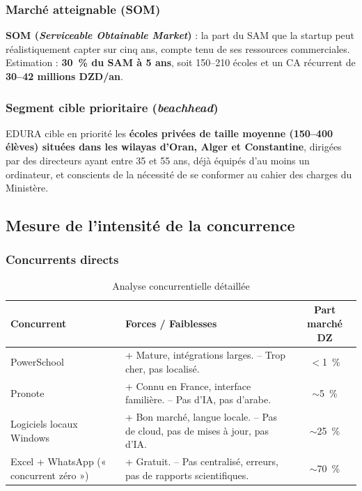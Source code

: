 \documentclass[12pt,a4paper,oneside]{report}
\begin{document}
\subsubsection{Marché atteignable (SOM)}

\textbf{SOM (\textit{Serviceable Obtainable Market})} : la part du SAM que la startup peut réalistiquement capter sur cinq ans, compte tenu de ses ressources commerciales. Estimation : \textbf{30~\% du SAM à 5 ans}, soit 150--210 écoles et un CA récurrent de \textbf{30--42 millions DZD/an}.

\subsubsection{Segment cible prioritaire (\textit{beachhead})}

EDURA cible en priorité les \textbf{écoles privées de taille moyenne (150--400 élèves) situées dans les wilayas d'Oran, Alger et Constantine}, dirigées par des directeurs ayant entre 35 et 55 ans, déjà équipés d'au moins un ordinateur, et conscients de la nécessité de se conformer au cahier des charges du Ministère.

\subsection{Mesure de l'intensité de la concurrence}

\subsubsection{Concurrents directs}

\begin{table}[H]
\centering
\caption{Analyse concurrentielle détaillée}
\label{tab:concurrence}
\begin{tabularx}{\textwidth}{lXc}
\toprule
\textbf{Concurrent} & \textbf{Forces / Faiblesses} & \textbf{Part marché DZ} \\
\midrule
PowerSchool & + Mature, intégrations larges. -- Trop cher, pas localisé. & $<$1~\% \\
Pronote & + Connu en France, interface familière. -- Pas d'IA, pas d'arabe. & $\sim$5~\% \\
Logiciels locaux Windows & + Bon marché, langue locale. -- Pas de cloud, pas de mises à jour, pas d'IA. & $\sim$25~\% \\
Excel + WhatsApp (« concurrent zéro ») & + Gratuit. -- Pas centralisé, erreurs, pas de rapports scientifiques. & $\sim$70~\% \\
\bottomrule
\end{tabularx}
\end{table}
\end{document}
